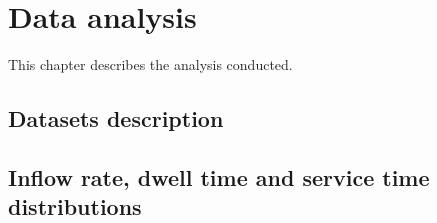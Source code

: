 \chapter{Data analysis}
\label{cha:data_analysis}

This chapter describes the analysis conducted.

\section{Datasets description}
\label{sec:datasets_description}

\section{Inflow rate, dwell time and service time distributions}
\label{sec:rates_distributions}

\clearpage